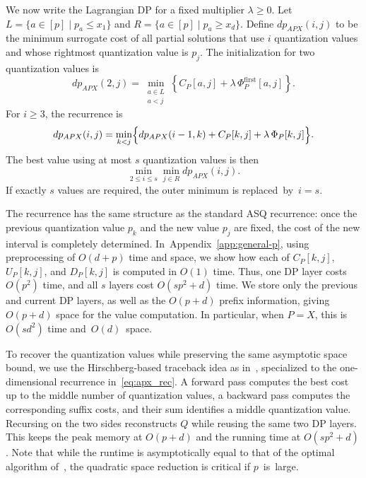 \documentclass[11pt,letterpaper]{article}
\begin{document}
{We now write the Lagrangian DP for a fixed multiplier $\lambda\ge0$. Let $L=\{a\in[p]\mid p_a\le x_1\}$ and $R=\{a\in[p]\mid p_a\ge x_d\}$. Define $dp_{APX}(i,j)$ to be the minimum surrogate cost of all partial solutions that use $i$ quantization values and whose rightmost quantization value is $p_j$. The initialization for two quantization values is
\begin{equation}
    dp_{APX}(2,j)
    =
    \min_{\substack{a\in L\\ a<j}}
    \left\{
        C_P[a,j]
        +\lambda\,\Phi^{\mathrm{first}}_P[a,j]
    \right\} .
    \label{eq:apx_base}
\end{equation}
For $i\ge3$, the recurrence is
\begin{equation}
\footnotesize
dp_{APX}(i,j)
=\min_{k<j}\Bigl\{dp_{APX}(i-1,k)
+C_P[k,j]+\lambda\,\Phi_P[k,j]\Bigr\}.
    \label{eq:apx_rec}
\end{equation}
The best value using at most $s$ quantization values is then
\begin{equation}
    \min_{2\le i\le s}\min_{j\in R} dp_{APX}(i,j) .
    \label{eq:apx_final}
\end{equation}
If exactly $s$ values are required, the outer minimum is \mbox{replaced by $i=s$.}

The recurrence has the same structure as the standard ASQ recurrence: once the previous quantization value $p_k$ and the new value $p_j$ are fixed, the cost of the new interval is completely determined. 
In~Appendix~\ref{app:general-p}, using preprocessing of $O(d+p)$ time and space, we show how each of $C_P[k,j]$, $U_P[k,j]$, and $D_P[k,j]$ is computed in $O(1)$ time. Thus, one DP layer costs $O(p^2)$ time, and all $s$ layers cost $O(sp^2+d)$ time. We store only the previous and current DP layers, as well as the $O(p+d)$ prefix information, giving $O(p+d)$ space for the value computation. In particular, when $P=X$, this is $O(sd^2)$ time \mbox{and $O(d)$ space.}

To recover the quantization values while preserving the same asymptotic space bound, we use the Hirschberg-based traceback idea as in~, specialized to the one-dimensional recurrence in~\eqref{eq:apx_rec}. A forward pass computes the best cost up to the middle number of quantization values, a backward pass computes the corresponding suffix costs, and their sum identifies a middle quantization value. Recursing on the two sides reconstructs $Q$ while reusing the same two DP layers. This keeps the peak memory at $O(p+d)$ and the running time at $O(sp^2+d)$. Note that while the runtime is asymptotically equal to that of the optimal algorithm of~, the quadratic space reduction is critical if \mbox{$p$ is large.}

}
\end{document}
